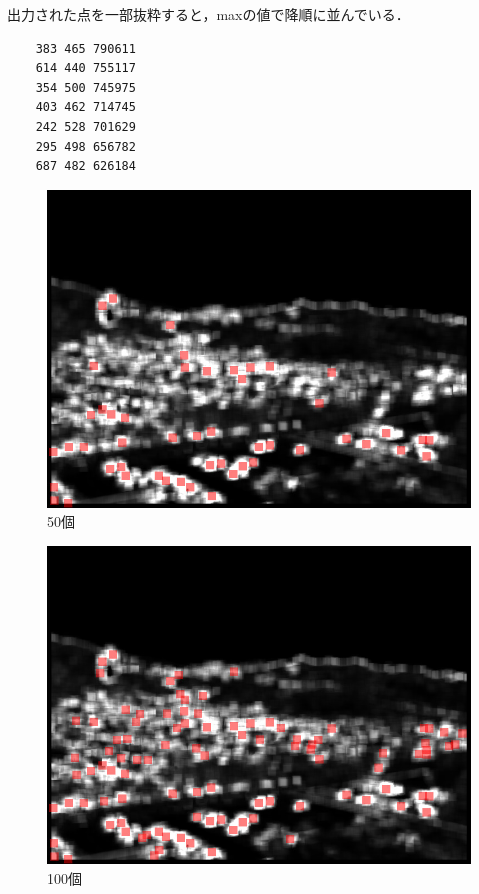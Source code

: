 \documentclass[11pt]{jarticle}
\begin{document}
出力された点を一部抜粋すると，maxの値で降順に並んでいる．
\begin{verbatim}
    383 465 790611
    614 440 755117
    354 500 745975
    403 462 714745
    242 528 701629
    295 498 656782
    687 482 626184
\end{verbatim}

\begin{figure}[ht]
  \centering
  \includegraphics[scale=.3]{50.jpg}
  \caption{50個}
\end{figure}

\begin{figure}[ht]
  \centering
  \includegraphics[scale=.3]{100.jpg}
  \caption{100個}
\end{figure}
\end{document}
